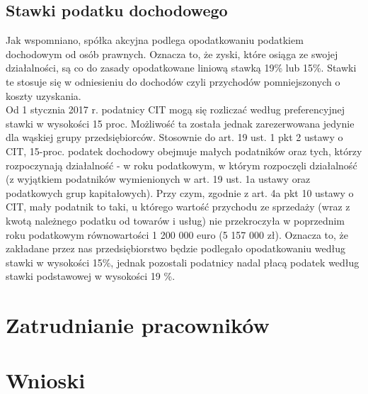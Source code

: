\documentclass[11pt]{article}
\begin{document}
	\subsection{Stawki podatku dochodowego}
	
	Jak wspomniano, spółka akcyjna podlega opodatkowaniu podatkiem dochodowym od osób prawnych. Oznacza to, że zyski, które osiąga ze swojej działalności, są co do zasady opodatkowane liniową stawką 19\% lub 15\%. Stawki te stosuje się w odniesieniu do dochodów czyli przychodów pomniejszonych o koszty uzyskania.\\
	Od 1 stycznia 2017 r. podatnicy CIT mogą się rozliczać według preferencyjnej stawki w wysokości 15 proc. Możliwość ta została jednak zarezerwowana jedynie dla wąskiej grupy przedsiębiorców. Stosownie do art. 19 ust. 1 pkt 2 ustawy o CIT, 15-proc. podatek dochodowy obejmuje małych podatników oraz tych, którzy rozpoczynają działalność - w roku podatkowym, w którym rozpoczęli działalność (z wyjątkiem podatników wymienionych w art. 19 ust. 1a ustawy oraz podatkowych grup kapitałowych). Przy czym, zgodnie z art. 4a pkt 10 ustawy o CIT, mały podatnik to taki, u którego wartość przychodu ze sprzedaży (wraz z kwotą należnego podatku od towarów i usług) nie przekroczyła w poprzednim roku podatkowym równowartości 1 200 000 euro (5 157 000 zł). Oznacza to, że zakładane przez nas przedsiębiorstwo będzie podlegało opodatkowaniu według stawki w wysokości 15\%, jednak pozostali podatnicy nadal płacą podatek według stawki podstawowej w wysokości 19 \%.
	
	\section{Zatrudnianie pracowników}
	
	\section{Wnioski}
    
\end{document}
